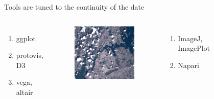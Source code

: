 \documentclass[xcolor={dvipsnames}, handout]{beamer}
\begin{document}
\begin{frame}{Tools are tuned to the continuity of the date \cite{HeerSoftware2006,toryRethinkingVisualizationHighlevel2004}}
\begin{columns}
        \begin{enumerate}
            \item ggplot\cite{wickhamGgplot2ElegantGraphics2016a}
            \item protovis\cite{bostockProtoviz2009}, D3 \cite{bostockDataDrivenDocuments2011}
            \item vega\cite{satyanarayanDeclarativeInteractionDesign2014}, altair\cite{vanderplasAltairInteractiveStatistical2018}
        \end{enumerate}
        \pause
        \begin{figure}
            \includegraphics[width=1\textwidth]{figures/intro/landsat.png}
        \end{figure}
        \begin{enumerate}
            \item ImageJ\cite{schneiderNIHImageImageJ2012}, ImagePlot\cite{studiesCulturevisImageplot2021}\item Napari\cite{nicholas_sofroniew_2021_4533308}
        \end{enumerate}
        \pause
        \begin{figure}

\end{figure}
\end{columns}
\end{frame}
\end{document}
